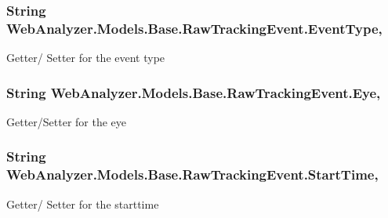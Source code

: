 \subsubsection[{Event\+Type}]{\setlength{\rightskip}{0pt plus 5cm}String Web\+Analyzer.\+Models.\+Base.\+Raw\+Tracking\+Event.\+Event\+Type\hspace{0.3cm}{\ttfamily [get]}, {\ttfamily [set]}}\label{class_web_analyzer_1_1_models_1_1_base_1_1_raw_tracking_event_a343b4b2132c9e961a5e08c7f65d238b4}


Getter/ Setter for the event type 

\hypertarget{class_web_analyzer_1_1_models_1_1_base_1_1_raw_tracking_event_aba0acbf6ec78782d58fe36422b344cbc}{}
\subsubsection[{Eye}]{\setlength{\rightskip}{0pt plus 5cm}String Web\+Analyzer.\+Models.\+Base.\+Raw\+Tracking\+Event.\+Eye\hspace{0.3cm}{\ttfamily [get]}, {\ttfamily [set]}}\label{class_web_analyzer_1_1_models_1_1_base_1_1_raw_tracking_event_aba0acbf6ec78782d58fe36422b344cbc}


Getter/\+Setter for the eye 

\hypertarget{class_web_analyzer_1_1_models_1_1_base_1_1_raw_tracking_event_a1af115e943c8a05d912c9370e8c9af36}{}
\subsubsection[{Start\+Time}]{\setlength{\rightskip}{0pt plus 5cm}String Web\+Analyzer.\+Models.\+Base.\+Raw\+Tracking\+Event.\+Start\+Time\hspace{0.3cm}{\ttfamily [get]}, {\ttfamily [set]}}\label{class_web_analyzer_1_1_models_1_1_base_1_1_raw_tracking_event_a1af115e943c8a05d912c9370e8c9af36}


Getter/ Setter for the starttime 

